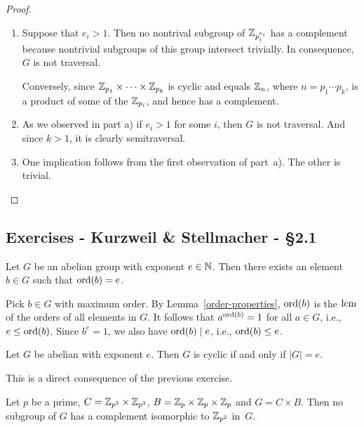 \begin{proof}${}$
\begin{enumerate}[\rm a)]
    \item Suppose that $e_i>1$. Then no nontrival subgroup of $\mathbb{Z}_{p_i^{e_i}}$ has a complement because nontrivial subgroups of this group intersect trivially. In consequence, $G$ is not traversal.
    
    Conversely, since $\mathbb{Z}_{p_1}\times\cdots\times\mathbb{Z}_{p_k}$ is cyclic and equals $\mathbb{Z}_n$, where $n=p_1\cdots p_k$, is a product of some of the $\mathbb{Z}_{p_i}$, and hence has a complement.

    \item As we observed in part a) if $e_i>1$ for some $i$, then $G$ is not traversal. And since $k>1$, it is clearly semitraversal.

    \item One implication follows from the first observation of part~a). The other is trivial.
\end{enumerate}
\end{proof}

\subsection{Exercises - Kurzweil \& Stellmacher - \S 2.1}

\begin{exr}
    Let\/ $G$ be an abelian group with exponent $e \in \mathbb{N}$. Then there exists an element\/ $b \in G$ such that\/ ${\rm ord}(b) = e$.
\end{exr}

\begin{solution} Pick $b\in G$ with maximum order. By Lemma~\ref{order-properties}, ${\rm ord}(b)$ is the $\operatorname{lcm}$ of the orders of all elements in $G$. It follows that $a^{{\rm ord}(b)}=1$ for all $a\in G$, i.e., $e\le{\rm ord}(b)$. Since $b^e=1$, we also have ${\rm ord}(b)\mid e$, i.e., ${\rm ord}(b)\le e$.  \end{solution}

\begin{exr}
    Let\/ $G$ be abelian with exponent\/ $e$. Then\/ $G$ is cyclic if and only if\/ $|G| = e$.
\end{exr}

\begin{solution} This is a direct consequence of the previous exercise.  \end{solution}

\begin{exr}
    Let\/ $p$ be a prime, $C = \mathbb{Z}_{p^3} \times \mathbb{Z}_{p^3}$, $B = \mathbb{Z}_p \times \mathbb{Z}_p \times \mathbb{Z}_p$ and\/ $G = C \times B$. Then no subgroup of\/ $G$ has a complement isomorphic to\/ $\mathbb{Z}_{p^2}$ in\/~$G$.
\end{exr}

